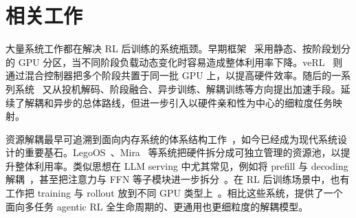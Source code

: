 \section{相关工作}
\label{sec:related_works}

大量系统工作都在解决 RL 后训练的系统瓶颈。早期框架~\cite{Harper_NeMo_a_toolkit,deepspeedchat,hu2024openrlhf} 采用静态、按阶段划分的 GPU 分区，当不同阶段负载动态变化时容易造成整体利用率下降。veRL~\cite{verl} 则通过混合控制器把多个阶段共置于同一批 GPU 上，以提高硬件效率。随后的一系列系统~\cite{liu2025specrlacceleratingonpolicyreinforcement,chen2025respecoptimizingspeculativedecoding,cheng2025fastllmposttrainingdecoupled,shao2025beatlongtaildistributionaware,RhymeRL,zhong2024rlhfuseefficientrlhftraining,areal,asyncflow,Laminar,StreamRL} 又从投机解码、阶段融合、异步训练、解耦训练等方向提出加速手段。\SystemName{}延续了解耦和异步的总体路线，但进一步引入以硬件亲和性为中心的细粒度任务映射。

资源解耦最早可追溯到面向内存系统的体系结构工作~\cite{disaggregated-mem-isca09}，如今已经成为现代系统设计的重要基石。LegoOS~\cite{shan2018legoos}、Mira~\cite{guo2023mira} 等系统把硬件拆分成可独立管理的资源池，以提升整体利用率。类似思想在 LLM serving 中尤其常见，例如将 prefill 与 decoding 解耦~\cite{distserve, patel2023splitwise, hu2024inference, strati2024dejavu, qin2024mooncake}，甚至把注意力与 FFN 等子模块进一步拆分~\cite{megascale-infer,step3}。在 RL 后训练场景中，也有工作把 training 与 rollout 放到不同 GPU 类型上~\cite{StreamRL,seamlessflow}。相比这些系统，\SystemName{}提供了一个面向多任务 agentic RL 全生命周期的、更通用也更细粒度的解耦模型。
